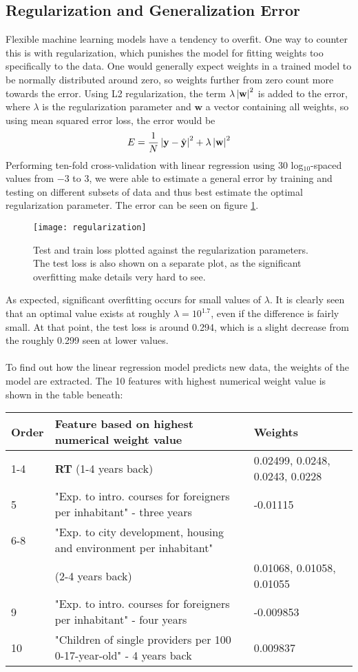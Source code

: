 \subsection{Regularization and Generalization Error}
Flexible machine learning models have a tendency to overfit.
One way to counter this is with regularization, which punishes the model for fitting weights too specifically to the data.
One would generally expect weights in a trained model to be normally distributed around zero, so weights further from zero count more towards the error.
Using L2 regularization, the term $ \lambda\left\lvert\mathbf w\right\rvert^2 $ is added to the error, where $ \lambda $ is the regularization parameter and $ \mathbf w $ a vector containing all weights, so using mean squared error loss, the error would be
\begin{equation*}
	E=\frac{1}{N}\left\lvert\mathbf y-\hat{\mathbf y}\right\rvert^2+\lambda\left\lvert\mathbf w\right\rvert^2
\end{equation*}
Performing ten-fold cross-validation with linear regression using 30 log$ _{10} $-spaced values from $ -3 $ to 3, we were able to estimate a general error by training and testing on different subsets of data and thus best estimate the optimal regularization parameter. The error can be seen on figure \ref{fig:reg}.
\begin{figure}[h!]
	\texttt{[image: regularization]}
	\caption{Test and train loss plotted against the regularization parameters. The test loss is also shown on a separate plot, as the significant overfitting make details very hard to see.}\label{fig:reg}
\end{figure}
As expected, significant overfitting occurs for small values of $ \lambda $. It is clearly seen that an optimal value exists at roughly $ \lambda=10^{1.7} $, even if the difference is fairly small. At that point, the test loss is around 0.294, which is a slight decrease from the roughly 0.299 seen at lower values.\\
\\
To find out how the linear regression model predicts new data, the weights of the model are extracted. The 10 features with highest numerical weight value is shown in the table beneath:
\begin{table}[H]
	\centering
	\small
	\begin{tabular}{l l l}
		Order &Feature based on highest numerical weight value & Weights	\\\hline
		1-4& \textbf{RT} (1-4 years back)  		& 0.02499, 0.0248,  0.0243, 0.0228 \\
		5&"Exp. to intro. courses for foreigners per inhabitant" - three years  	& -0.01115 \\
		6-8&"Exp. to city development, housing and environment per inhabitant"\\
		& (2-4 years back) & 0.01068, 0.01058, 0.01055 \\
		9&"Exp. to intro. courses for foreigners per inhabitant" - four years  & -0.009853
		\\
		10 &"Children of single providers per 100 0-17-year-old" - 4 years back & 0.009837
	\end{tabular}
\end{table}\noindent
